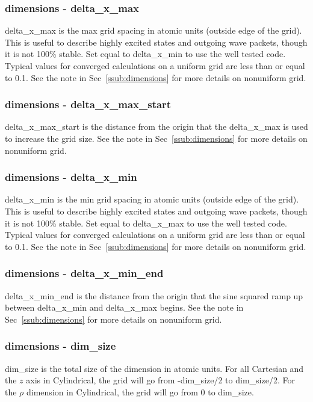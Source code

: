 \documentclass{article}
\begin{document}
\subsubsection{dimensions - delta\_x\_max}
delta\_x\_max is the max grid spacing in atomic units (outside edge of the grid). This is useful to describe highly excited states and outgoing wave packets, though it is not 100\% stable. Set equal to delta\_x\_min to use the well tested code. Typical values for converged calculations on a uniform grid are less than or equal to 0.1. See the note in Sec~\ref{ssub:dimensions} for more details on nonuniform grid.

\subsubsection{dimensions - delta\_x\_max\_start}
delta\_x\_max\_start is the distance from the origin that the delta\_x\_max is used to increase the grid size. See the note in Sec~\ref{ssub:dimensions} for more details on nonuniform grid.

\subsubsection{dimensions - delta\_x\_min}
delta\_x\_min is the min grid spacing in atomic units (outside edge of the grid). This is useful to describe highly excited states and outgoing wave packets, though it is not 100\% stable. Set equal to delta\_x\_max to use the well tested code. Typical values for converged calculations on a uniform grid are less than or equal to 0.1. See the note in Sec~\ref{ssub:dimensions} for more details on nonuniform grid.

\subsubsection{dimensions - delta\_x\_min\_end}
delta\_x\_min\_end is the distance from the origin that the sine squared ramp up between delta\_x\_min and delta\_x\_max begins. See the note in Sec~\ref{ssub:dimensions} for more details on nonuniform grid.

\subsubsection{dimensions - dim\_size}
\label{ssub:dimensions-dim_size}
dim\_size is the total size of the dimension in atomic units. For all Cartesian and the $z$ axis in Cylindrical, the grid will go from -dim\_size/2 to dim\_size/2. For the $\rho$ dimension in Cylindrical, the grid will go from 0 to dim\_size.
\end{document}
